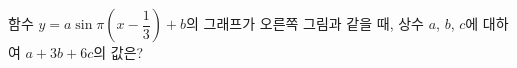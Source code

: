 \noindent\begin{minipage}[t]{0.58\linewidth}\vspace{0pt}\raggedright 함수 $y=a\sin\pi\left(x-\dfrac{1}{3}\right)+b$의 그래프가 오른쪽 그림과 같을 때, 상수 $a$, $b$, $c$에 대하여 $a+3b+6c$의 값은? \end{minipage}\hfill\begin{minipage}[t]{0.4\linewidth}\vspace{0pt}\centering \resizebox{\ifdim\width>\linewidth\linewidth\else\width\fi}{!}{}\end{minipage}\par
{}
